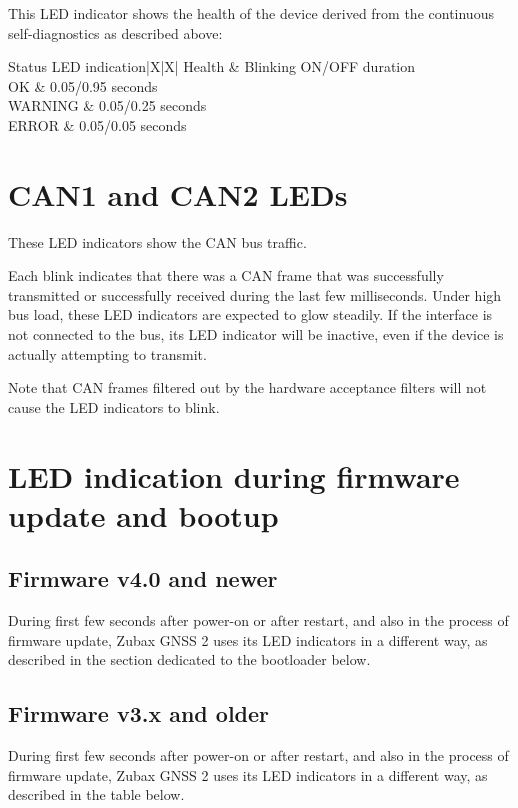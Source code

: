 \documentclass{zubaxdoc}
\begin{document}
This LED indicator shows the health of the device derived from the continuous self-diagnostics as described above:

\begin{ZubaxSimpleTable}{Status LED indication}{|X|X|}
Health 	& Blinking ON/OFF duration \\
OK		& 0.05/0.95 seconds\\
WARNING	& 0.05/0.25 seconds\\
ERROR	& 0.05/0.05 seconds
\end{ZubaxSimpleTable}

\section{CAN1 and CAN2 LEDs}

These LED indicators show the CAN bus traffic.

Each blink indicates that there was a CAN frame that was successfully transmitted or successfully received during the last few milliseconds. Under high bus load, these LED indicators are expected to glow steadily. If the interface is not connected to the bus, its LED indicator will be inactive, even if the device is actually attempting to transmit.

Note that CAN frames filtered out by the hardware acceptance filters will not cause the LED indicators to blink.

\section{LED indication during firmware update and bootup}

\subsection{Firmware v4.0 and newer}

During first few seconds after power-on or after restart, and also in the process of firmware update, Zubax GNSS 2 uses its LED indicators in a different way, as described in the section dedicated to the bootloader below.
\subsection{Firmware v3.x and older}

During first few seconds after power-on or after restart, and also in the process of firmware update, Zubax GNSS 2 uses its LED indicators in a different way, as described in the table below.
\end{document}
